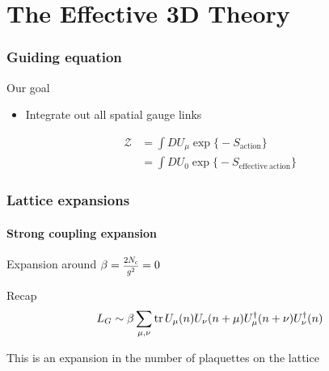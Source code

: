 \documentclass[12pt,a4paper,dvipsnames,usenames]{beamer}
\begin{document}
\section{The Effective 3D Theory}
\sectionframe

\begin{frame}
  \frametitle{Guiding equation}

  \begin{alertblock}{Our goal}
    \begin{itemize}
      \item \color{LightUIBase} Integrate out all spatial gauge links
    \end{itemize}
    \begin{align*}
      \mathcal{Z} &= \int D U_{\mu} \exp\big\{ \minus S_{\mathrm{action}} \big\} \\
      &= \int D U_0 \exp\big\{ \minus S_{\mathrm{effective \: action}} \big\}
    \end{align*}
  \end{alertblock}
  
\end{frame}

\begin{frame}
  \frametitle{Lattice expansions}
  \framesubtitle{Strong coupling expansion}

  Expansion around $\beta = \scalebox{0.75}{$\displaystyle\frac{2 N_c}{g^2}$} = 0$

  \vspace{2em}

  \begin{grayblock}{Recap}
    \[ L_G \sim \beta\sum_{\mu,\nu} \operatorname{tr} U_{\mu}(n) U_{\nu}(n+\mu) U^{\dagger}_{\mu}(n+\nu) U^{\dagger}_{\nu}(n) \]
  \end{grayblock}

  \vspace{1em}

  This is an expansion in the number of plaquettes on the lattice
  
\end{frame}
\end{document}
